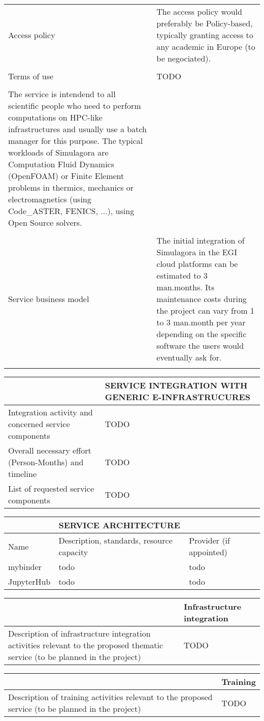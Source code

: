 \begin{longtable}{|p{7cm}|p{7cm}|}
\\
\\\hline
Access policy&
%
The access policy would preferably be Policy-based, typically granting
access to any academic in Europe (to be negociated).

\\
\\\hline
Terms of use&TODO\\
\\\hline
%
The service is intendend to all scientific people who need to perform
computations on HPC-like infrastructures and usually use a batch
manager for this purpose. The typical workloads of Simulagora are
Computation Fluid Dynamics (OpenFOAM) or Finite Element problems in
thermics, mechanics or electromagnetics (using Code\_ASTER, FENICS,
...), using Open Source solvers.

\\
\\\hline
Service business model&
%
The initial integration of Simulagora in the EGI cloud platforms can
be estimated to 3 man.months. Its maintenance costs during the project
can vary from 1 to 3 man.month per year depending on the specific
software the users would eventually ask for.

\\
\\\hline
\end{longtable}


\begin{tabular}{|p{7cm}|p{7cm}|}
&SERVICE INTEGRATION WITH GENERIC E-INFRASTRUCURES
\\\hline
Integration activity and concerned service components&TODO
\\\hline
Overall necessary effort (Person-Months) and timeline&TODO
\\\hline
List of requested service components&TODO
\\\hline
\end{tabular}

\begin{tabular}{|l|l|l|}
&SERVICE ARCHITECTURE&
\\\hline
Name&Description, standards, resource capacity&Provider (if appointed)
\\\hline
mybinder&todo&todo
\\\hline
JupyterHub&todo&todo
\\\hline
\end{tabular}

\begin{tabular}{|p{7cm}|l|}
  &Infrastructure integration
  \\\hline
  Description of infrastructure integration activities relevant to the proposed thematic service (to be planned in the project)&TODO
  \\\hline
\end{tabular}

\begin{tabular}{|p{7cm}|l|}
  &Training
  \\\hline
  Description of training activities relevant to the proposed service (to be planned in the project)&TODO
  \\\hline
\end{tabular}
